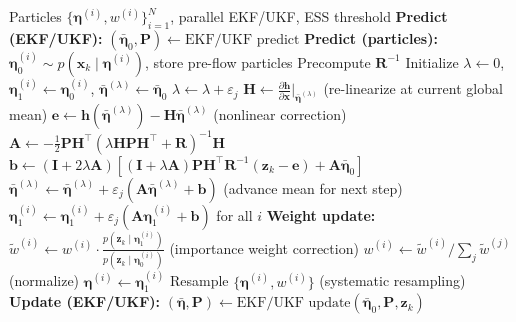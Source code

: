 \documentclass{article}
\begin{document}
\begin{algorithm}[H]
\caption{EDH Invertible Particle Flow Filter (Intermediate Re-linearization)}
\begin{algorithmic}[1]
\REQUIRE Particles $\{\boldsymbol{\eta}^{(i)}, w^{(i)}\}_{i=1}^N$, parallel EKF/UKF, ESS threshold
  \STATE \textbf{Predict (EKF/UKF):} $(\bar{\boldsymbol{\eta}}_0, \mathbf{P}) \leftarrow \text{EKF/UKF predict}$
  \STATE \textbf{Predict (particles):} $\boldsymbol{\eta}_0^{(i)} \sim p(\mathbf{x}_k \mid \boldsymbol{\eta}^{(i)})$, store pre-flow particles
  \STATE Precompute $\mathbf{R}^{-1}$
  \STATE Initialize $\lambda \leftarrow 0$, $\boldsymbol{\eta}_1^{(i)} \leftarrow \boldsymbol{\eta}_0^{(i)}$, $\bar{\boldsymbol{\eta}}^{(\lambda)} \leftarrow \bar{\boldsymbol{\eta}}_0$
    \STATE $\lambda \leftarrow \lambda + \varepsilon_j$
    \STATE $\mathbf{H} \leftarrow \frac{\partial \mathbf{h}}{\partial \mathbf{x}}\Big|_{\bar{\boldsymbol{\eta}}^{(\lambda)}}$ \hfill (re-linearize at current global mean)
    \STATE $\mathbf{e} \leftarrow \mathbf{h}(\bar{\boldsymbol{\eta}}^{(\lambda)}) - \mathbf{H}\bar{\boldsymbol{\eta}}^{(\lambda)}$ \hfill (nonlinear correction)
    \STATE $\mathbf{A} \leftarrow -\tfrac{1}{2}\mathbf{P}\mathbf{H}^\top(\lambda\mathbf{H}\mathbf{P}\mathbf{H}^\top + \mathbf{R})^{-1}\mathbf{H}$
    \STATE $\mathbf{b} \leftarrow (\mathbf{I}+2\lambda\mathbf{A})[(\mathbf{I}+\lambda\mathbf{A})\mathbf{P}\mathbf{H}^\top\mathbf{R}^{-1}(\mathbf{z}_k - \mathbf{e}) + \mathbf{A}\bar{\boldsymbol{\eta}}_0]$
    \STATE $\bar{\boldsymbol{\eta}}^{(\lambda)} \leftarrow \bar{\boldsymbol{\eta}}^{(\lambda)} + \varepsilon_j(\mathbf{A}\bar{\boldsymbol{\eta}}^{(\lambda)} + \mathbf{b})$ \hfill (advance mean for next step)
    \STATE $\boldsymbol{\eta}_1^{(i)} \leftarrow \boldsymbol{\eta}_1^{(i)} + \varepsilon_j(\mathbf{A}\boldsymbol{\eta}_1^{(i)} + \mathbf{b})$ for all $i$
  \ENDFOR
  \STATE \textbf{Weight update:}
  \STATE $\tilde{w}^{(i)} \leftarrow w^{(i)} \cdot \frac{p(\mathbf{z}_k \mid \boldsymbol{\eta}_1^{(i)})}{p(\mathbf{z}_k \mid \boldsymbol{\eta}_0^{(i)})}$ \hfill (importance weight correction)
  \STATE $w^{(i)} \leftarrow \tilde{w}^{(i)} / \sum_j \tilde{w}^{(j)}$ \hfill (normalize)
  \STATE $\boldsymbol{\eta}^{(i)} \leftarrow \boldsymbol{\eta}_1^{(i)}$
    \STATE Resample $\{\boldsymbol{\eta}^{(i)}, w^{(i)}\}$ \hfill (systematic resampling)
  \ENDIF
  \STATE \textbf{Update (EKF/UKF):} $(\bar{\boldsymbol{\eta}}, \mathbf{P}) \leftarrow \text{EKF/UKF update}(\bar{\boldsymbol{\eta}}_0, \mathbf{P}, \mathbf{z}_k)$
\ENDFOR
\end{algorithmic}
\end{algorithm}
\end{document}
